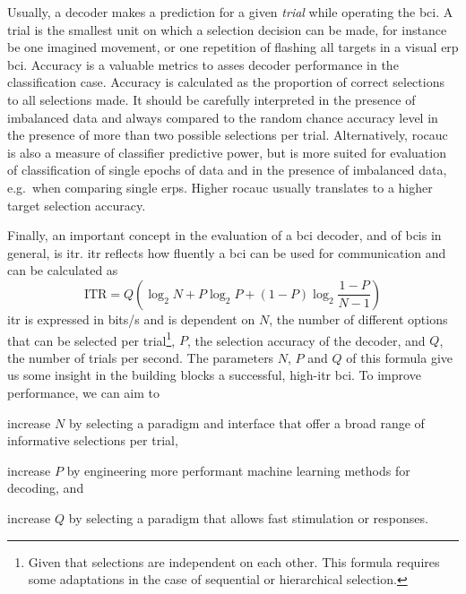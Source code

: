 Usually, a decoder makes a prediction for a given \emph{trial} while operating
the \ac{bci}.
A trial is the smallest unit on which a selection decision can be made, for
instance be one imagined movement, or one repetition of flashing all targets
in a visual \ac{erp} \ac{bci}.
Accuracy is a valuable metrics to asses decoder performance in the classification
case.
Accuracy is calculated as the proportion of correct selections to all
selections made.
It should be carefully interpreted in the presence of imbalanced data and always compared to the
random chance accuracy level in the presence of more than two possible
selections per trial.
Alternatively, \ac{rocauc} is also a measure of classifier predictive power, but is more
suited for evaluation of classification of single epochs of data and in the
presence of imbalanced data, e.g.\ when comparing single \acp{erp}.
Higher \ac{rocauc} usually translates to a higher target selection accuracy.

Finally, an important concept in the evaluation of a \ac{bci} decoder, and of \acp{bci}
in general, is \ac{itr}.
\Ac{itr} reflects how fluently a \ac{bci} can be used for communication and can
be calculated as
\begin{equation}
	\text{ITR} = Q\left(\log_2N+P\log_2P+(1-P)\log_2\frac{1-P}{N-1}\right)
\end{equation}
\Ac{itr} is expressed in bits/s and is dependent on $N$, the number of
different options that can be selected per trial\footnote{Given that selections
are independent on each other. This formula requires some adaptations in the
case of sequential or hierarchical selection.}, $P$, the selection accuracy
of the decoder, and $Q$, the number of trials per second.
The parameters $N$, $P$ and $Q$ of this formula give us some insight in the
building blocks a successful, high-\ac{itr} \ac{bci}.
To improve performance, we can aim to
\begin{enumerate*}[label={\arabic*})]
\item increase $N$ by selecting a paradigm and interface that offer a
broad range of informative selections per trial,
\item increase $P$ by engineering more performant machine learning methods for
decoding, and
\item increase $Q$ by selecting a paradigm that allows fast stimulation or
responses.
\end{enumerate*}


